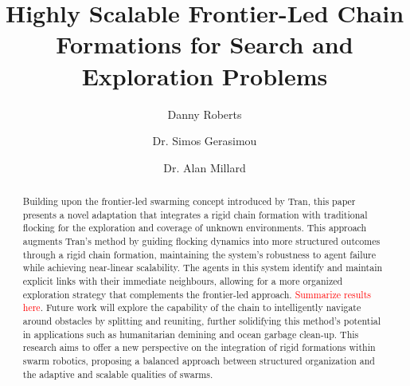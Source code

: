 \documentclass[runningheads]{llncs}
\newcommand\incomplete[1]{\textcolor{red}{#1}}
\begin{document}
%
\title{Highly Scalable Frontier-Led Chain Formations for Search and Exploration Problems}

\author{Danny Roberts \and
Dr. Simos Gerasimou \and
Dr. Alan Millard}


\maketitle 

\begin{abstract}
Building upon the frontier-led swarming concept introduced by Tran\cite{tran2022}, this paper presents a novel adaptation that integrates a rigid chain formation with traditional flocking for the exploration and coverage of unknown environments. This approach augments Tran's method by guiding flocking dynamics into more structured outcomes through a rigid chain formation, maintaining the system's robustness to agent failure while achieving near-linear scalability. The agents in this system identify and maintain explicit links with their immediate neighbours, allowing for a more organized exploration strategy that complements the frontier-led approach. \incomplete{Summarize results here}. Future work will explore the capability of the chain to intelligently navigate around obstacles by splitting and reuniting, further solidifying this method's potential in applications such as humanitarian demining and ocean garbage clean-up. This research aims to offer a new perspective on the integration of rigid formations within swarm robotics, proposing a balanced approach between structured organization and the adaptive and scalable qualities of swarms.


\end{abstract}
\end{document}
